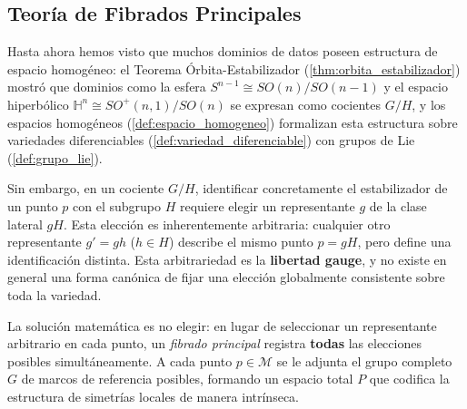 \subsection{Teoría de Fibrados Principales}\label{subsec:fibrados_principales}

Hasta ahora hemos visto que muchos dominios de datos poseen estructura de espacio homogéneo: el Teorema Órbita-Estabilizador (\ref{thm:orbita_estabilizador}) mostró que dominios como la esfera $S^{n-1} \cong SO(n)/SO(n-1)$ y el espacio hiperbólico $\mathbb{H}^n \cong SO^+(n,1)/SO(n)$ se expresan como cocientes $G/H$, y los espacios homogéneos (\autoref{def:espacio_homogeneo}) formalizan esta estructura sobre variedades diferenciables (\autoref{def:variedad_diferenciable}) con grupos de Lie (\autoref{def:grupo_lie}).

Sin embargo, en un cociente $G/H$, identificar concretamente el estabilizador de un punto $p$ con el subgrupo $H$ requiere elegir un representante $g$ de la clase lateral $gH$. Esta elección es inherentemente arbitraria: cualquier otro representante $g' = gh$ ($h \in H$) describe el mismo punto $p = gH$, pero define una identificación distinta. Esta arbitrariedad es la \textbf{libertad gauge}, y no existe en general una forma canónica de fijar una elección globalmente consistente sobre toda la variedad.

La solución matemática es no elegir: en lugar de seleccionar un representante arbitrario en cada punto, un \textit{fibrado principal} registra \textbf{todas} las elecciones posibles simultáneamente. A cada punto $p \in \mathcal{M}$ se le adjunta el grupo completo $G$ de marcos de referencia posibles, formando un espacio total $P$ que codifica la estructura de simetrías locales de manera intrínseca.


